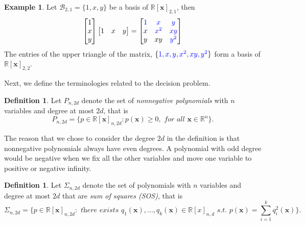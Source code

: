 \documentclass[12pt]{amsart}
\numberwithin{equation}{section}
\theoremstyle{definition}
\newtheorem{definition}[thm]{Definition}
\newtheorem{example}[thm]{Example}
\numberwithin{thm}{section}
\begin{document}
\begin{example}
     Let $\mathcal{B}_{2, 1} = \{1, x, y\}$ be a basis of $\mathbb{R}[\mathbf{x}]_{2, 1}$, then 
     \begin{equation*}
          \begin{bmatrix}
               1 \\
               x \\
               y
          \end{bmatrix}
          \begin{bmatrix}
               1 & x & y
          \end{bmatrix}
          = \begin{bmatrix}
               \color{blue} 1 & \color{blue}x & \color{blue}y \\
               x & \color{blue}x^2 & \color{blue}xy \\
               y & xy & \color{blue}y^2 \\
          \end{bmatrix}
     \end{equation*}
     The entries of the upper triangle of the matrix, $\{\color{blue}1, x, y, x^2, xy, y^2\color{black}\}$ form a basis of $\mathbb{R}[\mathbf{x}]_{2, 2}$.
\end{example}

\smallskip

Next, we define the terminologies related to the decision problem.

\begin{definition}
     \label{def:NGP}
     Let $P_{n, 2d}$ denote the set of \emph{nonnegative polynomials} with 
     $n$ variables and degree at most $2d$, that is 
     \begin{equation*}
          P_{n, 2d} = \{ p \in \mathbb{R}[\mathbf{x}]_{n, 2d}: p(\mathbf{x}) \geq 0, \textit{ for all } \mathbf{x} \in \mathbb{R}^n \}.
     \end{equation*}
\end{definition}


The reason that we chose to consider the degree $2d$ in the definition is that {nonnegative polynomials} always have even degrees.
A polynomial with odd degree would be negative when we fix all the other variables and move one variable to positive or negative infinity. 

\begin{definition}
     \label{def:SOS}
          Let $\Sigma_{n,2d}$ denote the set of polynomials with $n$ variables and degree at most
          $2d$ that are \emph{sum of squares (SOS)}, that is
          \begin{equation*}
               \Sigma_{n, 2d} = \{ p \in \mathbb{R}[\mathbf{x}]_{n, 2d}: \textit{ there exists } q_1(\mathbf{x}), ..., q_k(\mathbf{x}) \in \mathbb{R}[x]_{n,d} \textit{ s.t. }  p(\mathbf{x}) = \sum_{i=1}^k q_i^2(\mathbf{x})\}.
          \end{equation*}     
\end{definition}
\end{document}
